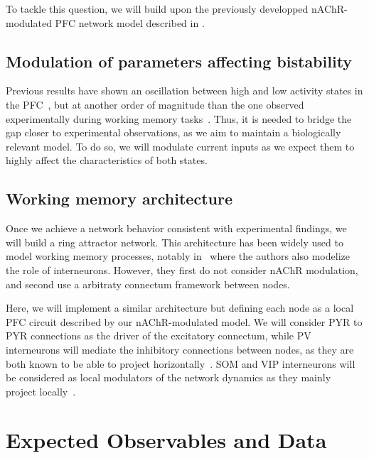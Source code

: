 \documentclass[10pt,letterpaper]{article}
\begin{document}
To tackle this question, we will build upon the previously developped nAChR-modulated PFC network model described in \citet{Koukouli2025}.

\subsection{Modulation of parameters affecting bistability}
Previous results have shown an oscillation between high and low activity states in the PFC~\citep{Rooy2021}, but at another order of magnitude than the one observed experimentally during working memory tasks~\citep{Compte2003}. Thus, it is needed to bridge the gap closer to experimental observations, as we aim to maintain a biologically relevant model. To do so, we will modulate current inputs as we expect them to highly affect the characteristics of both states.

\subsection{Working memory architecture}
Once we achieve a network behavior consistent with experimental findings, we will build a ring attractor network. This architecture has been widely used to model working memory processes, notably in~\citep{Wang2004} where the authors also modelize the role of interneurons. However, they first do not consider nAChR modulation, and second use a arbitraty connectum framework between nodes. 

Here, we will implement a similar architecture but defining each node as a local PFC circuit described by our nAChR-modulated model. We will consider PYR to PYR connections as the driver of the excitatory connectum, while PV interneurons will mediate the inhibitory connections between nodes, as they are both known to be able to project horizontally~\citep{Levitt1993,Druga2023}. SOM and VIP interneurons will be considered as local modulators of the network dynamics as they mainly project locally~\citep{Karnani2016,Riedemann2019}.

\section{Expected Observables and Data}
\end{document}

